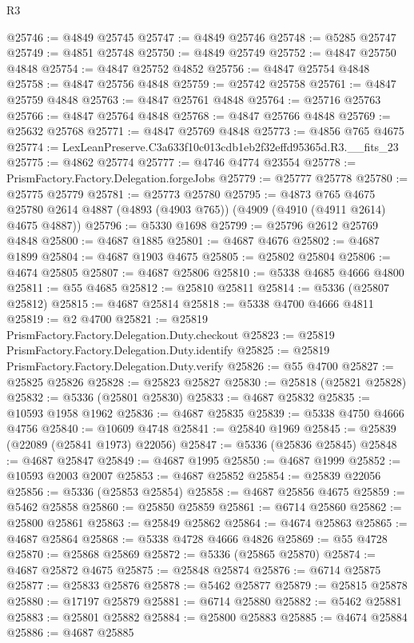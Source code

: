 \begin{lexlean}{R3}
\begin{coremodule}
@25746 := @4849 @25745
@25747 := @4849 @25746
@25748 := @5285 @25747
@25749 := @4851 @25748
@25750 := @4849 @25749
@25752 := @4847 @25750 @4848
@25754 := @4847 @25752 @4852
@25756 := @4847 @25754 @4848
@25758 := @4847 @25756 @4848
@25759 := @25742 @25758
@25761 := @4847 @25759 @4848
@25763 := @4847 @25761 @4848
@25764 := @25716 @25763
@25766 := @4847 @25764 @4848
@25768 := @4847 @25766 @4848
@25769 := @25632 @25768
@25771 := @4847 @25769 @4848
@25773 := @4856 @765 @4675
@25774 := LexLeanPreserve.C3a633f10c013cdb1eb2f32effd95365d.R3.__fits_23
@25775 := @4862 @25774
@25777 := @4746 @4774 @23554
@25778 := PrismFactory.Factory.Delegation.forgeJobs
@25779 := @25777 @25778
@25780 := @25775 @25779
@25781 := @25773 @25780
@25795 := @4873
    @765
    @4675
    @25780
    @2614
    @4887
    (@4893 (@4903 @765))
    (@4909 (@4910 (@4911 @2614) @4675 @4887))
@25796 := @5330 @1698
@25799 := @25796 @2612 @25769 @4848
@25800 := @4687 @1885
@25801 := @4687 @4676
@25802 := @4687 @1899
@25804 := @4687 @1903 @4675
@25805 := @25802 @25804
@25806 := @4674 @25805
@25807 := @4687 @25806
@25810 := @5338 @4685 @4666 @4800
@25811 := @55 @4685
@25812 := @25810 @25811
@25814 := @5336 (@25807 @25812)
@25815 := @4687 @25814
@25818 := @5338 @4700 @4666 @4811
@25819 := @2 @4700
@25821 := @25819 PrismFactory.Factory.Delegation.Duty.checkout
@25823 := @25819 PrismFactory.Factory.Delegation.Duty.identify
@25825 := @25819 PrismFactory.Factory.Delegation.Duty.verify
@25826 := @55 @4700
@25827 := @25825 @25826
@25828 := @25823 @25827
@25830 := @25818 (@25821 @25828)
@25832 := @5336 (@25801 @25830)
@25833 := @4687 @25832
@25835 := @10593 @1958 @1962
@25836 := @4687 @25835
@25839 := @5338 @4750 @4666 @4756
@25840 := @10609 @4748
@25841 := @25840 @1969
@25845 := @25839 (@22089 (@25841 @1973) @22056)
@25847 := @5336 (@25836 @25845)
@25848 := @4687 @25847
@25849 := @4687 @1995
@25850 := @4687 @1999
@25852 := @10593 @2003 @2007
@25853 := @4687 @25852
@25854 := @25839 @22056
@25856 := @5336 (@25853 @25854)
@25858 := @4687 @25856 @4675
@25859 := @5462 @25858
@25860 := @25850 @25859
@25861 := @6714 @25860
@25862 := @25800 @25861
@25863 := @25849 @25862
@25864 := @4674 @25863
@25865 := @4687 @25864
@25868 := @5338 @4728 @4666 @4826
@25869 := @55 @4728
@25870 := @25868 @25869
@25872 := @5336 (@25865 @25870)
@25874 := @4687 @25872 @4675
@25875 := @25848 @25874
@25876 := @6714 @25875
@25877 := @25833 @25876
@25878 := @5462 @25877
@25879 := @25815 @25878
@25880 := @17197 @25879
@25881 := @6714 @25880
@25882 := @5462 @25881
@25883 := @25801 @25882
@25884 := @25800 @25883
@25885 := @4674 @25884
@25886 := @4687 @25885

\end{coremodule}
\end{lexlean}
